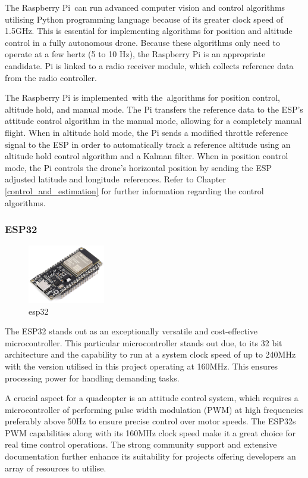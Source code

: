\documentclass{article}
\begin{document}
The Raspberry Pi can run advanced computer vision and control algorithms utilising Python programming language because of its greater clock speed of 1.5GHz. This is essential for implementing algorithms for position and altitude control in a fully autonomous drone. Because these algorithms only need to operate at a few hertz (5 to 10 Hz), the Raspberry Pi is an appropriate candidate. 
Pi is linked to a radio receiver module, which collects reference data from the radio controller.

The Raspberry Pi is implemented with the algorithms for position control, altitude hold, and manual mode. The Pi transfers the reference data to the ESP's attitude control algorithm in the manual mode, allowing for a completely manual flight. When in altitude hold mode, the Pi sends a modified throttle reference signal to the ESP in order to automatically track a reference altitude 
using an altitude hold control algorithm and a Kalman filter. When in position control mode, the Pi controls the drone's horizontal position by sending the ESP adjusted latitude and longitude references. Refer to Chapter \ref{control_and_estimation} for further information regarding the control algorithms. 

\subsubsection{ESP32}
\begin{figure}[H]
  \centering
  \includegraphics[width=0.3\textwidth]{Pictures/esp32.png}
  \caption{esp32}
  \label{fig:esp32}
\end{figure}
The ESP32 stands out as an exceptionally versatile and cost-effective microcontroller. This particular microcontroller stands out due, to its 32 bit architecture and the capability to run at a system clock speed of up to 240MHz with the version utilised in this project operating at 160MHz. This ensures processing power for handling demanding tasks.

A crucial aspect for a quadcopter is an attitude control system, which requires a microcontroller of performing pulse width modulation (PWM) at high frequencies preferably above 50Hz to ensure precise control over motor speeds. The ESP32s PWM capabilities along with its 160MHz clock speed make it a great choice for real time control operations. The strong community support and extensive 
documentation further enhance its suitability for projects offering developers an array of resources to utilise.
\end{document}
